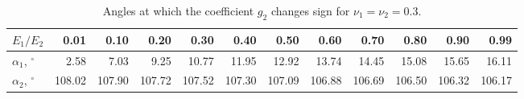 \begin{table}[htbp]
  \centering
  \caption{Angles at which the coefficient $g_2$ changes sign for
  $\nu_1=\nu_2=0.3$.}
  \label{tab:g2-transition-angles}
  \scriptsize
  \setlength{\tabcolsep}{2.6pt}
  \begin{tabular}{@{}lrrrrrrrrrrr@{}}
    \toprule
    $E_1/E_2$ & 0.01 & 0.10 & 0.20 & 0.30 & 0.40 & 0.50 & 0.60 & 0.70 & 0.80 & 0.90 & 0.99 \\
    \midrule
    $\alpha_1$, $^\circ$ & 2.58 & 7.03 & 9.25 & 10.77 & 11.95 & 12.92 & 13.74 & 14.45 & 15.08 & 15.65 & 16.11 \\
    $\alpha_2$, $^\circ$ & 108.02 & 107.90 & 107.72 & 107.52 & 107.30 & 107.09 & 106.88 & 106.69 & 106.50 & 106.32 & 106.17 \\
    \bottomrule
  \end{tabular}
\end{table}

